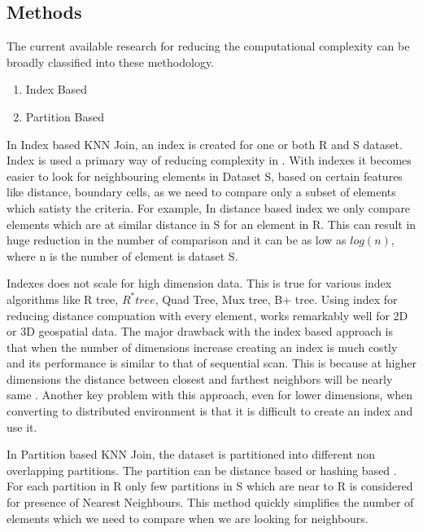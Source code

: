 \documentclass[conference]{IEEEtran}
\begin{document}
\subsection{Methods}
The current available research for reducing the computational
complexity can be broadly classified into these methodology.
\begin{enumerate}
\item Index Based
\item Partition Based
\end{enumerate}

\medskip

In Index based KNN Join, an index is created for one or both R and S
dataset. Index is used a primary way of reducing complexity in \cite{jagadish_idistance:_2005}
\cite{yu_efficient_2007} \cite{bohm_epsilon_2001}.  With indexes it
becomes easier to look for neighbouring elements in Dataset S, based
on certain features like distance, boundary cells,  as we
need to compare only a subset of elements which satisty the
criteria. For example, In distance based index
\cite{jagadish_idistance:_2005} we only compare elements which are at
similar distance in S for an element in R. This can result in huge
reduction in the number of comparison and it can be as low as $log(n)$, where n is the number of element is
dataset S.

\medskip

Indexes does not scale for high dimension data. This is true for various
index algorithms like R tree, $R^* tree$, Quad Tree, Mux tree, B+
tree. Using index for reducing distance compuation with every element, works
remarkably well for 2D or 3D geospatial data. The major drawback with the
index based approach is that when the number of dimensions increase
creating an index is much costly and its performance is similar to
that of sequential scan. This is because at higher dimensions the distance
between closest and farthest neighbors will be nearly same
\cite{beyer_when_1999}. Another key problem with this approach, even
for lower dimensions, when
converting to distributed environment is that it is difficult to
create an index and use it.

\bigskip

In Partition based KNN Join, the dataset is partitioned into different
non overlapping partitions. The
partition can be distance based\cite{lu_efficient_2012} or hashing
based \cite{stupar_rankreduceprocessing_2010} \cite{yao_k_2010}. For each partition in R only few partitions in S which are
near to R is considered for presence of Nearest Neighbours. This
method quickly simplifies the number of elements which we need to
compare when we are looking for neighbours.
\end{document}
